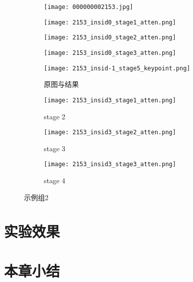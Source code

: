 \begin{figure*}
	\centering
	\begin{minipage}{\textwidth}
		\centering
		\begin{subfigure}{0.23\linewidth}
			\texttt{[image: 000000002153.jpg]}
		\end{subfigure}
		\begin{subfigure}{0.23\linewidth}
			\texttt{[image: 2153\_insid0\_stage1\_atten.png]}
		\end{subfigure}
		\begin{subfigure}{0.23\linewidth}
			\texttt{[image: 2153\_insid0\_stage2\_atten.png]}
		\end{subfigure}
		\begin{subfigure}{0.23\linewidth}
			\texttt{[image: 2153\_insid0\_stage3\_atten.png]}
		\end{subfigure}
		\begin{sideways}
			\begin{minipage}{1cm}
			\end{minipage}
		\end{sideways}
	\end{minipage}
	
	\vskip2pt
	\begin{minipage}{\textwidth}
		\centering
		\begin{subfigure}{0.23\linewidth}
			\texttt{[image: 2153\_insid-1\_stage5\_keypoint.png]}
			\caption{原图与结果}
		\end{subfigure}
		\begin{subfigure}{0.23\linewidth}
			\texttt{[image: 2153\_insid3\_stage1\_atten.png]}
			\caption{stage 2}
		\end{subfigure}
		\begin{subfigure}{0.23\linewidth}
			\texttt{[image: 2153\_insid3\_stage2\_atten.png]}
			\caption{stage 3}
		\end{subfigure}
		\begin{subfigure}{0.23\linewidth}
			\texttt{[image: 2153\_insid3\_stage3\_atten.png]}
			\caption{stage 4}
		\end{subfigure}
		\begin{sideways}
			\begin{minipage}{1cm}
				\rightline{被遮挡人}
			\end{minipage}
		\end{sideways}
	\end{minipage}
	\label{fig:parallel1}
	\caption{示例组2}
\end{figure*}


\section{实验效果}
\label{sec:demo}

\section{本章小结}